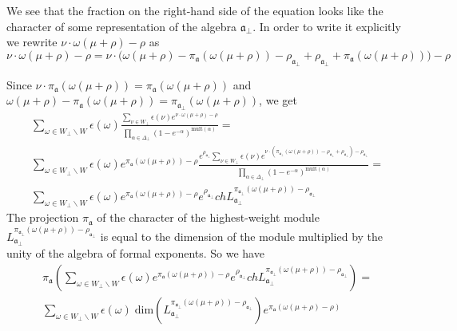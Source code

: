 \documentclass[a4paper,12pt]{article}
\theoremstyle{definition} \newtheorem{Def}{Definition}
\begin{document}
We see that the fraction on the right-hand side of the equation looks like the character of some representation of the algebra $\mathfrak{a}_{\bot}$. 
In order to write it explicitly we rewrite $\nu\cdot\omega(\mu+\rho)-\rho$ as
\begin{equation}
  \label{eq:30}
  \nu\cdot\omega(\mu+\rho)-\rho=\nu\cdot \bigl(\omega(\mu+\rho)-\pi_{\mathfrak{a}}(\omega(\mu+\rho))-\rho_{\mathfrak{a}_{\bot}}+\rho_{\mathfrak{a}_{\bot}}+\pi_{\mathfrak{a}}(\omega(\mu+\rho))\bigr)-\rho
\end{equation}

Since $\nu\cdot \pi_{\mathfrak{a}}(\omega(\mu+\rho))=\pi_{\mathfrak{a}}(\omega(\mu+\rho))$ and $\omega(\mu+\rho)-\pi_{\mathfrak{a}}(\omega(\mu+\rho))=\pi_{\mathfrak{a}_{\bot}}(\omega(\mu+\rho))$, we get
\begin{multline}
  \label{eq:14}
  \sum_{\omega\in W_{\bot}\backslash W} \epsilon(\omega) \frac{\sum_{\nu\in W_{\bot}}\epsilon(\nu) e^{\nu \cdot \omega(\mu+\rho)-\rho}}{\prod_{\alpha\in\Delta_{\bot}}(1-e^{-\alpha})^{\mathrm{mult}(\alpha)}} =\\
  \sum_{\omega\in W_{\bot}\backslash W} \epsilon(\omega) e^{\pi_{\mathfrak{a}}(\omega(\mu+\rho))-\rho} \frac{e^{\rho_{\mathfrak{a}_{\bot}} }\sum_{\nu\in W_{\bot}}\epsilon(\nu) e^{\nu \cdot (\pi_{\mathfrak{a}_{\bot}}(\omega(\mu+\rho))-\rho_{\mathfrak{a}_{\bot}}+\rho_{\mathfrak{a}_{\bot}})-\rho_{\mathfrak{a}_{\bot}}}}{\prod_{\alpha\in\Delta_{\bot}}(1-e^{-\alpha})^{\mathrm{mult}(\alpha)}}=\\
  \sum_{\omega\in W_{\bot}\backslash W} \epsilon(\omega) e^{\pi_{\mathfrak{a}}(\omega(\mu+\rho))-\rho}e^{\rho_{\mathfrak{a}_{\bot}}} ch L^{\pi_{\mathfrak{a}_{\bot}}(\omega(\mu+\rho))-\rho_{\mathfrak{a}_{\bot}}}_{\mathfrak{a}_{\bot}}
\end{multline}
The projection $\pi_{\mathfrak{a}}$ of the character of the highest-weight module $L^{\pi_{\mathfrak{a}_{\bot}}(\omega(\mu+\rho))-\rho_{\mathfrak{a}_{\bot}}}_{\mathfrak{a}_{\bot}}$ is equal to the dimension of the module multiplied by the unity of the algebra of formal exponents. So we have
  \begin{multline}
    \label{eq:15}
    \pi_{\mathfrak{a}}\left( \sum_{\omega\in W_{\bot}\backslash W} \epsilon(\omega) e^{\pi_{\mathfrak{a}}(\omega(\mu+\rho))-\rho}e^{\rho_{\mathfrak{a}_{\bot}}} ch L^{\pi_{\mathfrak{a}_{\bot}}(\omega(\mu+\rho))-\rho_{\mathfrak{a}_{\bot}}}_{\mathfrak{a}_{\bot}}\right) = \\
    \sum_{\omega\in W_{\bot}\backslash W} \epsilon(\omega)\; \mathrm{dim}\left(L^{\pi_{\mathfrak{a}_{\bot}}(\omega(\mu+\rho))-\rho_{\mathfrak{a}_{\bot}}}_{\mathfrak{a}_{\bot}}\right) e^{\pi_{\mathfrak{a}}(\omega(\mu+\rho)-\rho)}
  \end{multline}
\end{document}
